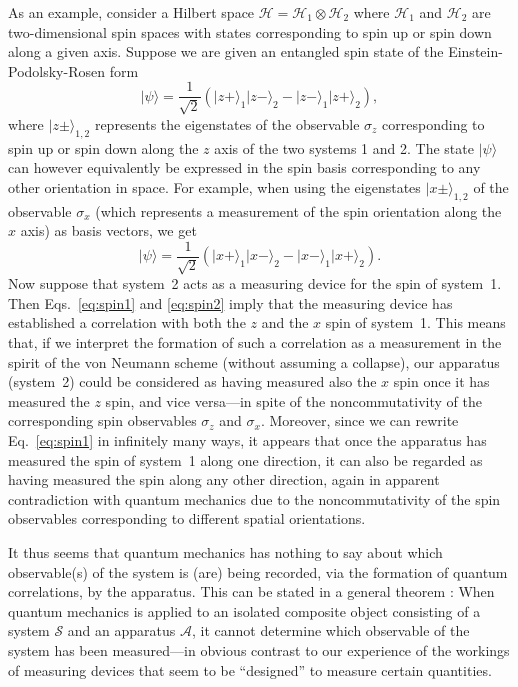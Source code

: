 \documentclass[rmp,aps,amsmath,amsfonts,noshowkeys,noshowpacs,12pt]{revtex4}
\newcommand{\ket}[1]{\ensuremath{|{#1\rangle}}}
\begin{document}
As an example, consider a Hilbert space
$\mathcal{H}=\mathcal{H}_1\otimes \mathcal{H}_2$ where $\mathcal{H}_1$
and $\mathcal{H}_2$ are two-dimensional spin spaces with states
corresponding to spin up or spin down along a given axis. Suppose we
are given an entangled spin state of the Einstein-Podolsky-Rosen form
\cite{Einstein:1935:dr}
%
\begin{equation} \label{eq:spin1} 
\ket{\psi} = \frac{1}{\sqrt{2}} (\ket{z+}_1
\ket{z-}_2 - \ket{z-}_1 \ket{z+}_2), 
\end{equation}
%
where $\ket{z\pm}_{1,2}$ represents the eigenstates of the observable
$\sigma_z$ corresponding to spin up or spin down along the $z$ axis of
the two systems 1 and 2. The state $\ket{\psi}$ can however
equivalently be expressed in the spin basis corresponding to any other
orientation in space. For example, when using the eigenstates
$\ket{x\pm}_{1,2}$ of the observable $\sigma_x$ (which represents a
measurement of the spin orientation along the $x$ axis) as basis
vectors, we get
%
\begin{equation} \label{eq:spin2} 
\ket{\psi} = \frac{1}{\sqrt{2}} (\ket{x+}_1
\ket{x-}_2 - \ket{x-}_1 \ket{x+}_2). 
\end{equation}
%
Now suppose that system~2 acts as a measuring device for the spin of
system~1.  Then Eqs.~\eqref{eq:spin1} and \eqref{eq:spin2} imply that
the measuring device has established a correlation with both the $z$
and the $x$ spin of system~1. This means that, if we interpret the
formation of such a correlation as a measurement in the spirit of the
von Neumann scheme (without assuming a collapse), our apparatus
(system~2) could be considered as having measured also the $x$ spin
once it has measured the $z$ spin, and vice versa---in spite of the
noncommutativity of the corresponding spin observables $\sigma_z$ and
$\sigma_x$. Moreover, since we can rewrite Eq.~\eqref{eq:spin1} in
infinitely many ways, it appears that once the apparatus has measured
the spin of system~1 along one direction, it can also be regarded as
having measured the spin along any other direction, again in apparent
contradiction with quantum mechanics due to the noncommutativity of
the spin observables corresponding to different spatial orientations.

It thus seems that quantum mechanics has nothing to say about which
observable(s) of the system is (are) being recorded, via the formation
of quantum correlations, by the apparatus. This can be stated in a
general theorem \citep{Zurek:1981:dd,Auletta:2000:rv}: When quantum
mechanics is applied to an isolated composite object consisting
of a system $\mathcal{S}$ and an apparatus $\mathcal{A}$, it cannot
determine which observable of the system has been measured---in
obvious contrast to our experience of the workings of measuring
devices that seem to be ``designed'' to measure certain quantities.
\end{document}
